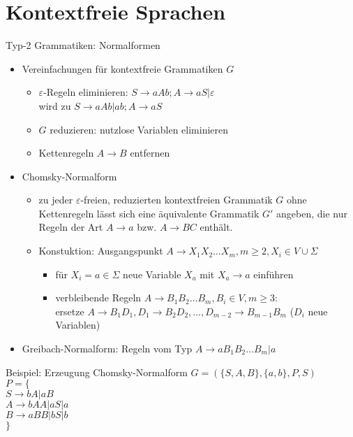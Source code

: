 \section{Kontextfreie Sprachen}

\begin{frame}{Typ-2 Grammatiken: Normalformen}
	\begin{itemize}
		\item Vereinfachungen für kontextfreie Grammatiken $G$
		\begin{itemize}
			\item $\varepsilon$-Regeln eliminieren: $S \rightarrow aAb; A \rightarrow aS|\varepsilon$\\
			wird zu	$S \rightarrow aAb|ab; A \rightarrow aS$
			\item $G$ reduzieren: nutzlose Variablen eliminieren
			\item Kettenregeln $A \rightarrow B$ entfernen
		\end{itemize}
		\item Chomsky-Normalform
		\begin{itemize}
			\item zu jeder $\varepsilon$-freien, reduzierten kontextfreien Grammatik $G$ ohne Kettenregeln lässt sich eine äquivalente Grammatik $G'$ angeben, die nur Regeln der Art $A \rightarrow a$ bzw. $A \rightarrow BC$ enthält.
			\item Konstuktion: Ausgangspunkt $A\rightarrow X_1X_2 \ldots X_m, m\geq 2, X_i \in V \cup \Sigma$
			\begin{itemize}
				\item für $X_i=a\in \Sigma$ neue Variable $X_a$ mit $X_a \rightarrow a$ einführen
				\item verbleibende Regeln $A \rightarrow B_1B_2\ldots B_m, B_i \in V, m\geq 3$:\\
				ersetze $A \rightarrow B_1D_1, D_1\rightarrow B_2D_2, \ldots, D_{m-2}\rightarrow B_{m-1}B_m$ ($D_i$ neue Variablen)
			\end{itemize}
		\end{itemize}
		\item Greibach-Normalform: Regeln vom Typ $A \rightarrow aB_1B_2 \ldots B_m|a$
	\end{itemize}
\end{frame}

\begin{frame}{Beispiel: Erzeugung Chomsky-Normalform}
	$G=(\{S, A, B\}, \{a, b\}, P, S)$\\
	$P=\{$\\
	\qquad\qquad $S\rightarrow bA|aB$\\
	\qquad\qquad $A\rightarrow bAA|aS|a$\\
	\qquad\qquad $B\rightarrow aBB|bS|b$\\
	\qquad$\}$
\end{frame}

